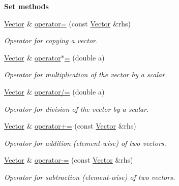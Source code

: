 \begin{Indent}{\bf Set methods}\par
\begin{DoxyCompactItemize}
\item 
\hyperlink{class_q_u_e_s_o_1_1_vector}{Vector} \& \hyperlink{class_q_u_e_s_o_1_1_vector_a8e3451f3bc05af3759ddb777189dc7e2}{operator=} (const \hyperlink{class_q_u_e_s_o_1_1_vector}{Vector} \&rhs)
\begin{DoxyCompactList}\small\item\em Operator for copying a vector. \end{DoxyCompactList}\item 
\hyperlink{class_q_u_e_s_o_1_1_vector}{Vector} \& \hyperlink{class_q_u_e_s_o_1_1_vector_af1a8f1617cf82e549b7a26d009c62c55}{operator$\ast$=} (double a)
\begin{DoxyCompactList}\small\item\em Operator for multiplication of the vector by a scalar. \end{DoxyCompactList}\item 
\hyperlink{class_q_u_e_s_o_1_1_vector}{Vector} \& \hyperlink{class_q_u_e_s_o_1_1_vector_a6f8be42a68c7bef0b33968941d4e421e}{operator/=} (double a)
\begin{DoxyCompactList}\small\item\em Operator for division of the vector by a scalar. \end{DoxyCompactList}\item 
\hyperlink{class_q_u_e_s_o_1_1_vector}{Vector} \& \hyperlink{class_q_u_e_s_o_1_1_vector_a8ec0e4eb7a2cb461f1274e2092f3717a}{operator+=} (const \hyperlink{class_q_u_e_s_o_1_1_vector}{Vector} \&rhs)
\begin{DoxyCompactList}\small\item\em Operator for addition (element-\/wise) of two vectors. \end{DoxyCompactList}\item 
\hyperlink{class_q_u_e_s_o_1_1_vector}{Vector} \& \hyperlink{class_q_u_e_s_o_1_1_vector_ab6436829fafb50ad2f6627e70bafab77}{operator-\/=} (const \hyperlink{class_q_u_e_s_o_1_1_vector}{Vector} \&rhs)
\begin{DoxyCompactList}\small\item\em Operator for subtraction (element-\/wise) of two vectors. \end{DoxyCompactList}\end{DoxyCompactItemize}
\end{Indent}
